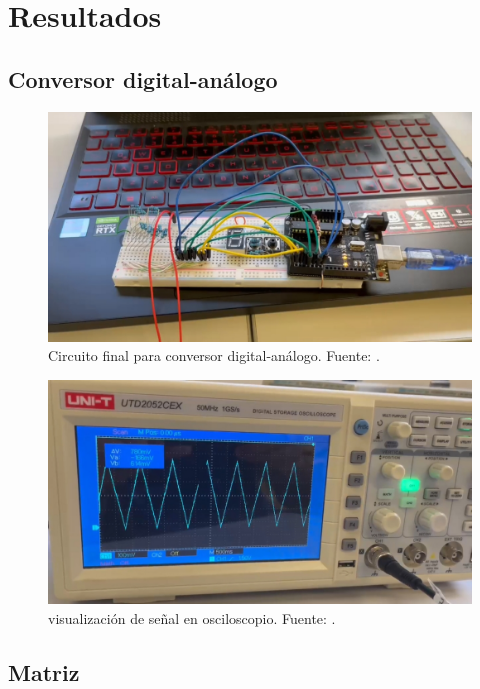 \section{Resultados}
\subsection{Conversor digital-análogo}
\begin{figure}[H]
  \centering
  \includegraphics[width=\linewidth]{./Anexos/Resultados/DAC/Circuito.jpg}
  \caption{Circuito final para conversor digital-análogo. Fuente: \cite{LabDrive}.}
  \label{fig:conversor_circuito}
\end{figure}

\begin{figure}[H]
  \centering
  \includegraphics[width=\linewidth]{./Anexos/Resultados/DAC/Ocsiloscopio.jpg}
  \caption{visualización de señal en osciloscopio. Fuente: \cite{LabDrive}.}
  \label{fig:conversor_osciloscopio}
\end{figure}
\subsection{Matriz}


